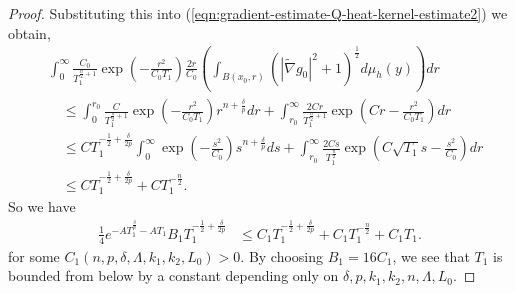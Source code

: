 \documentclass[12pt]{amsart}
\theoremstyle{plain}
\theoremstyle{plain}
\theoremstyle{definition}
\theoremstyle{remark}
\numberwithin{equation}{subsection}
\newcommand{\hdel}{\tilde{\nabla}}
\begin{document}
\begin{proof}
    Substituting this into (\ref{eqn:gradient-estimate-Q-heat-kernel-estimate2}) we obtain,
    \begin{align*}
        &\int_0^{\infty} \frac{C_0}{T_1^{\frac{n}{2}+1}}\exp\left(-\frac{r^2}{C_0 T_1}\right)\frac{2r}{C_0}\left(\int_{B(x_0, r)}\left(|\hdel g_0|^2 + 1\right)^{\frac{1}{2}}d\mu_h(y)\right)dr \nonumber \\
        &\quad \leq \int_0^{r_0} \frac{C}{T_1^{\frac{n}{2}+1}}\exp\left(-\frac{r^2}{C_0 T_1}\right)r^{n+\frac{\delta}{p}}dr + \int_{r_0}^{\infty} \frac{2Cr}{T_1^{\frac{n}{2}+1}}\exp\left(Cr-\frac{r^2}{C_0 T_1}\right)  dr \nonumber \\
        &\quad \leq CT_1^{-\frac{1}{2}+\frac{\delta}{2p}}\int_0^\infty\exp\left(-\frac{s^2}{C_0}\right)s^{n+\frac{\delta}{p}}ds + \int_{r_0}^\infty \frac{2Cs}{T_1^{\frac{n}{2}}}\exp\left(C\sqrt{T_1}s- \frac{s^2}{C_0} \right) dr\\
        &\quad\leq CT_1^{-\frac{1}{2}+\frac{\delta}{2p}} +  CT_1^{-\frac{n}{2}}.
    \end{align*}
    So we have
    \begin{align}\label{eqn:gradient-estimate-Q-heat-kernel-estimate4}
        \frac14 e^{-AT_1^{\frac{\delta}{p}}-AT_1}B_1T_1^{-\frac{1}{2}+\frac{\delta}{2p}} &\leq C_1 T_1^{-\frac{1}{2}+\frac{\delta}{2p}} +  C_1T_1^{-\frac{n}{2}}+ C_1 T_1.
    \end{align}
    for some $C_1(n,p,\delta,\Lambda,k_1,k_2,L_0)>0$.
    By choosing $B_1=16C_1$, we see that $T_1$ is bounded from below by a constant depending only on $\delta,p,k_1,k_2,n,\Lambda,L_0$.
\end{proof}
\end{document}
